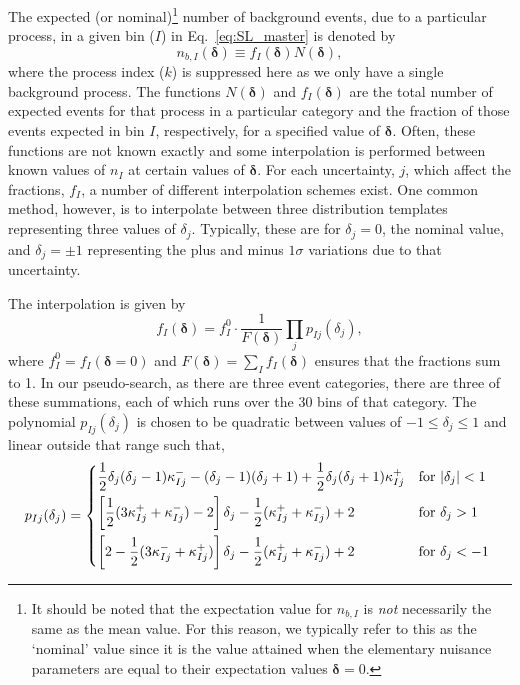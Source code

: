 \documentclass[11pt]{article}
\begin{document}
The expected (or nominal)\footnote{It should be noted that the expectation value for $n_{b,I}$ is \emph{not} necessarily the same as the mean value. For this reason, we typically refer
to this as the `nominal' value since it is the value attained when the elementary nuisance parameters are equal to their expectation values $\mathbf{\delta}=0$.} number of background events, due to a particular process, in a given bin ($I$) in %
Eq.~\eqref{eq:SL_master} is denoted by
%
\begin{equation}
  n_{b,I}(\bm{\delta}) \equiv %
  f_{I}(\bm{\delta}) N(\bm{\delta}),
\end{equation}
%
where the process index ($k$) is suppressed here as we only have a single background process. The functions $N(\bm{\delta})$ and  $f_{I}(\bm{\delta})$ are the total number of expected events for that process in a particular
category and the fraction of those events expected in bin $I$, respectively, for a specified value of $\bm{\delta}$. Often, these functions are not known exactly and some interpolation is performed between known
values of $n_{I}$ at certain values of $\bm{\delta}$. For each uncertainty, $j$, which affect the fractions, $f_{I}$, a number of different interpolation schemes exist. One common method, however, is to interpolate between
three distribution templates representing three values of $\delta_{j}$. Typically, these are for $\delta_{j}=0$, the nominal value, and $\delta_{j}=\pm1$ representing the plus and minus $1\sigma$ variations due to that uncertainty.

The interpolation is given by
%
\begin{equation}
 f_{I}(\bm{\delta}) = f_{I}^{0}\cdot\frac{1}{F(\bm{\delta})} \prod_{j} p_{Ij}(\delta_{j}),
 \label{eqn:frac_function}
\end{equation}
%
where $f_{I}^{0}=f_{I}(\bm{\delta}=0)$ and $F(\bm{\delta})=\sum_{I}f_{I}(\bm{\delta})$ ensures that the fractions sum to 1. In our pseudo-search, as there are three event categories,
there are three of these summations, each of which runs over the 30 bins of that category. The polynomial $p_{Ij}(\delta_{j})$ is chosen to be quadratic between values of $-1 \leq \delta_{j} \leq 1$
and linear outside that range such that,
\begin{equation}
 p_{Ij}(\delta_{j}) = \begin{dcases*}
 		\frac{1}{2} \delta_{j}(\delta_{j}-1) \kappa_{Ij}^{-}  -(\delta_{j}-1)(\delta_{j}+1) + \frac{1}{2}\delta_{j}(\delta_{j}+1)\kappa_{Ij}^{+} & for $|\delta_{j}|<1$ \\
        \left[ \frac{1}{2}(3\kappa_{Ij}^{+} + \kappa_{Ij}^{-})-2\right]\delta_{j} - \frac{1}{2}(\kappa_{Ij}^{+}+\kappa_{Ij}^{-})+2 & for $\delta_{j}>1$ \\
         \left[2-\frac{1}{2}(3\kappa_{Ij}^{-} + \kappa_{Ij}^{+})\right]\delta_{j} - \frac{1}{2}(\kappa_{Ij}^{+}+\kappa_{Ij}^{-})+2 & for $\delta_{j}<-1$ \\
    \end{dcases*}
\end{equation}
\end{document}
